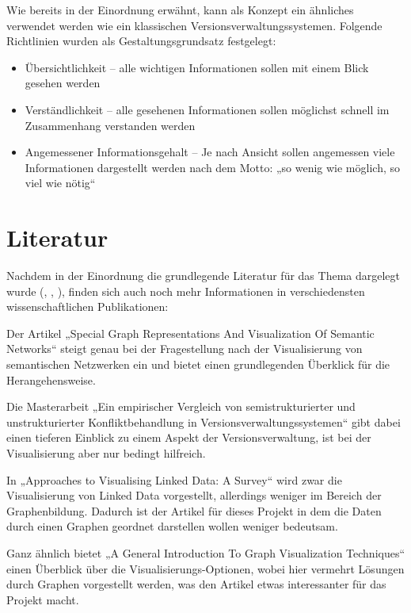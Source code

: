 \documentclass[color, ddc]{tudscrreprt}
\begin{document}
Wie bereits in der Einordnung erwähnt, kann als Konzept ein ähnliches verwendet werden wie ein klassischen Versionsverwaltungssystemen. Folgende Richtlinien wurden als Gestaltungsgrundsatz festgelegt:
\begin{itemize}
\item Übersichtlichkeit -- alle wichtigen Informationen sollen mit einem Blick gesehen werden
\item Verständlichkeit -- alle gesehenen Informationen sollen möglichst schnell im Zusammenhang verstanden werden
\item Angemessener Informationsgehalt -- Je nach Ansicht sollen angemessen viele Informationen dargestellt werden nach dem Motto: „so wenig wie möglich, so viel wie nötig“
\end{itemize}

\section{Literatur}

Nachdem in der Einordnung die grundlegende Literatur für das Thema dargelegt wurde (\cite{pascal:semanic-web}, \cite{graube:r43ples}, \cite{url:git}), finden sich auch noch mehr Informationen in verschiedensten wissenschaftlichen Publikationen:

Der Artikel „Special Graph Representations And Visualization Of Semantic Networks“ \cite{borisenko:graph-representation} steigt genau bei der Fragestellung nach der Visualisierung von semantischen Netzwerken ein und bietet einen grundlegenden Überklick für die Herangehensweise.

Die Masterarbeit „Ein empirischer Vergleich von semistrukturierter und unstrukturierter Konfliktbehandlung in Versionsverwaltungssystemen“ \cite{brandl:versionsverwaltung} gibt dabei einen tieferen Einblick zu einem Aspekt der Versionsverwaltung, ist bei der Visualisierung aber nur bedingt hilfreich.

In „Approaches to Visualising Linked Data: A Survey“ \cite{dadzie:linked-data} wird zwar die Visualisierung von Linked Data vorgestellt, allerdings weniger im Bereich der Graphenbildung. Dadurch ist der Artikel für dieses Projekt in dem die Daten durch einen Graphen geordnet darstellen wollen weniger bedeutsam.

Ganz ähnlich bietet „A General Introduction To Graph Visualization Techniques“ \cite{tarawneh:graph-visualization} einen Überblick über die Visualisierungs-Optionen, wobei hier vermehrt Lösungen durch Graphen vorgestellt werden, was den Artikel etwas interessanter für das Projekt macht.
\end{document}
